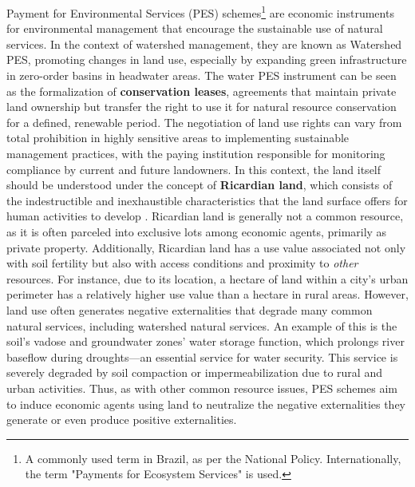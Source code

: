 \documentclass[./main_en.tex]{subfiles}
\begin{document}
\par Payment for Environmental Services (PES) schemes\footnote{A commonly used term in Brazil, as per the National Policy. Internationally, the term "Payments for Ecosystem Services" is used.} are economic instruments for environmental management that encourage the sustainable use of natural services. In the context of watershed management, they are known as Watershed PES, promoting changes in land use, especially by expanding green infrastructure in zero-order basins in headwater areas. The water PES instrument can be seen as the formalization of \textbf{conservation leases}, agreements that maintain private land ownership but transfer the right to use it for natural resource conservation for a defined, renewable period. The negotiation of land use rights can vary from total prohibition in highly sensitive areas to implementing sustainable management practices, with the paying institution responsible for monitoring compliance by current and future landowners. In this context, the land itself should be understood under the concept of \textbf{Ricardian land}, which consists of the indestructible and inexhaustible characteristics that the land surface offers for human activities to develop \cite{haddad2023}. Ricardian land is generally not a common resource, as it is often parceled into exclusive lots among economic agents, primarily as private property. Additionally, Ricardian land has a use value associated not only with soil fertility but also with access conditions and proximity to \textit{other} resources. For instance, due to its location, a hectare of land within a city’s urban perimeter has a relatively higher use value than a hectare in rural areas. However, land use often generates negative externalities that degrade many common natural services, including watershed natural services. An example of this is the soil's vadose and groundwater zones’ water storage function, which prolongs river baseflow during droughts—an essential service for water security. This service is severely degraded by soil compaction or impermeabilization due to rural and urban activities. Thus, as with other common resource issues, PES schemes aim to induce economic agents using land to neutralize the negative externalities they generate or even produce positive externalities.
\end{document}
